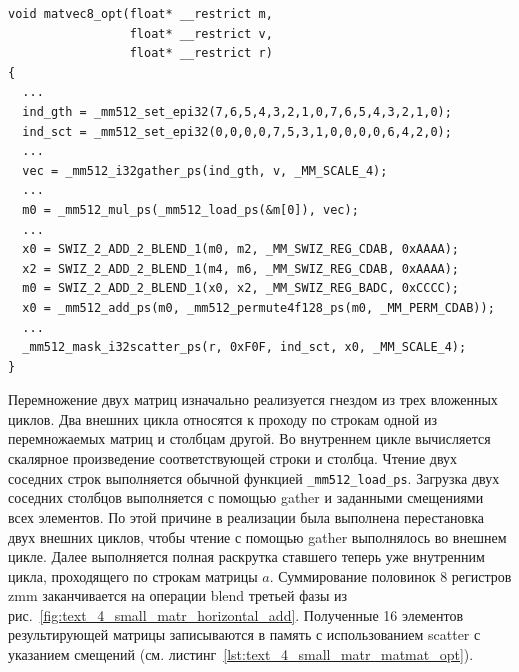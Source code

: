 \begin{singlespace}
\begin{lstlisting}[caption={Векторизованная версия умножения матрицы \\ размера $8 \times 8$ на вектор.}, label={lst:text4_small_matr_matvec_opt}]
void matvec8_opt(float* __restrict m,
                 float* __restrict v,
                 float* __restrict r)
{
  ...
  ind_gth = _mm512_set_epi32(7,6,5,4,3,2,1,0,7,6,5,4,3,2,1,0);
  ind_sct = _mm512_set_epi32(0,0,0,0,7,5,3,1,0,0,0,0,6,4,2,0);
  ...
  vec = _mm512_i32gather_ps(ind_gth, v, _MM_SCALE_4);
  ...
  m0 = _mm512_mul_ps(_mm512_load_ps(&m[0]), vec);
  ...
  x0 = SWIZ_2_ADD_2_BLEND_1(m0, m2, _MM_SWIZ_REG_CDAB, 0xAAAA);
  x2 = SWIZ_2_ADD_2_BLEND_1(m4, m6, _MM_SWIZ_REG_CDAB, 0xAAAA);
  m0 = SWIZ_2_ADD_2_BLEND_1(x0, x2, _MM_SWIZ_REG_BADC, 0xCCCC);
  x0 = _mm512_add_ps(m0, _mm512_permute4f128_ps(m0, _MM_PERM_CDAB));
  ...
  _mm512_mask_i32scatter_ps(r, 0xF0F, ind_sct, x0, _MM_SCALE_4);
}
\end{lstlisting}
\end{singlespace}

Перемножение двух матриц изначально реализуется гнездом из трех вложенных циклов.
Два внешних цикла относятся к проходу по строкам одной из перемножаемых матриц и столбцам другой.
Во внутреннем цикле вычисляется скалярное произведение соответствующей строки и столбца.
Чтение двух соседних строк выполняется обычной функцией \texttt{\_mm512\_load\_ps}.
Загрузка двух соседних столбцов выполняется с помощью gather и заданными смещениями всех элементов.
По этой причине в реализации была выполнена перестановка двух внешних циклов, чтобы чтение с помощью gather выполнялось во внешнем цикле.
Далее выполняется полная раскрутка ставшего теперь уже внутренним цикла, проходящего по строкам матрицы $a$.
Суммирование половинок 8 регистров zmm заканчивается на операции blend третьей фазы из рис.~\ref{fig:text_4_small_matr_horizontal_add}.
Полученные 16 элементов результирующей матрицы записываются в память с использованием scatter с указанием смещений (см. листинг~\ref{lst:text_4_small_matr_matmat_opt}).


